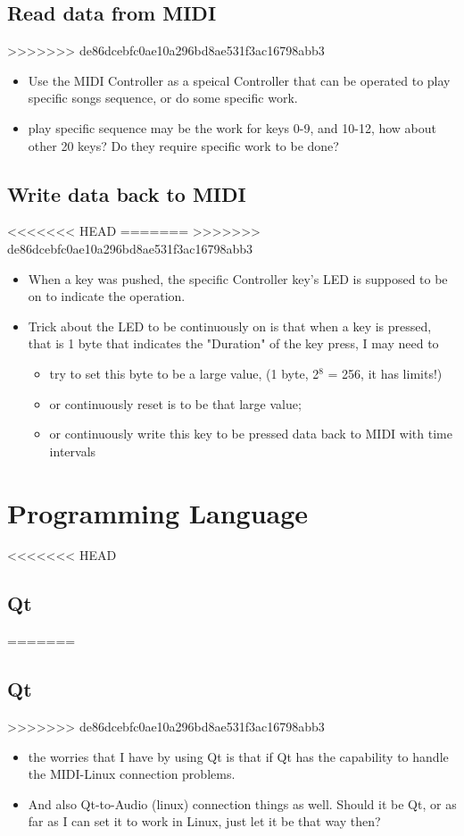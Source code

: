 \documentclass[9pt,b5paper]{article}
\begin{document}
\subsection{Read data from MIDI}
\label{sec-12-1}
>>>>>>> de86dcebfc0ae10a296bd8ae531f3ac16798abb3
\begin{itemize}
\item Use the MIDI Controller as a speical Controller that can be operated to play specific songs sequence, or do some specific work.
\item play specific sequence may be the work for keys 0-9, and 10-12, how about other 20 keys? Do they require specific work to be done?
\end{itemize}
\subsection{Write data back to MIDI}
<<<<<<< HEAD
\label{sec-13-2}
=======
\label{sec-12-2}
>>>>>>> de86dcebfc0ae10a296bd8ae531f3ac16798abb3
\begin{itemize}
\item When a key was pushed, the specific Controller key's LED is supposed to be on to indicate the operation.
\item Trick about the LED to be continuously on is that when a key is pressed, that is 1 byte that indicates the "Duration" of the key press, I may need to 
\begin{itemize}
\item try to set this byte to be a large value, (1 byte, 2$^{\text{8}}$ = 256, it has limits!)
\item or continuously reset is to be that large value;
\item or continuously write this key to be pressed data back to MIDI with time intervals
\end{itemize}
\end{itemize}
\section{Programming Language}
<<<<<<< HEAD
\label{sec-14}
\subsection{Qt}
\label{sec-14-1}
=======
\label{sec-13}
\subsection{Qt}
\label{sec-13-1}
>>>>>>> de86dcebfc0ae10a296bd8ae531f3ac16798abb3
\begin{itemize}
\item the worries that I have by using Qt is that if Qt has the capability to handle the MIDI-Linux connection problems.
\item And also Qt-to-Audio (linux) connection things as well. Should it be Qt, or as far as I can set it to work in Linux, just let it be that way then?
\end{itemize}
\end{document}
